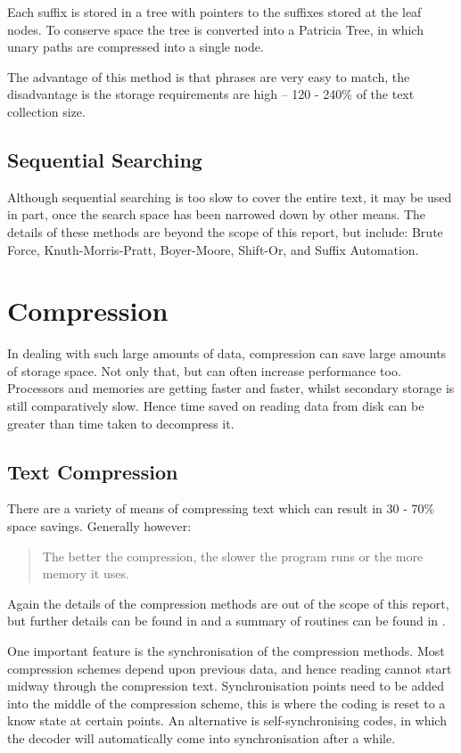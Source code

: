 Each suffix is stored in a tree with pointers to the suffixes stored at
the leaf nodes.  To conserve space the tree is converted into a Patricia
Tree, in which unary paths are compressed into a single node.

The advantage of this method is that phrases are very easy to match, the
disadvantage is the storage requirements are high -- 120 - 240\% of the 
text collection size.

\subsection{Sequential Searching}
Although sequential searching is too slow to cover the entire text, it may
be used in part, once the search space has been narrowed down by other
means.  The details of these methods are beyond the scope of this report,
but include: Brute Force, Knuth-Morris-Pratt, Boyer-Moore, Shift-Or,
and Suffix Automation.      

\section{Compression}
In dealing with such large amounts of data, compression can save large
amounts of storage space.  Not only that, but can often increase
performance too.  Processors and memories are getting faster and faster,
whilst secondary storage is still comparatively slow.  Hence time saved on
reading data from disk can be greater than time taken to decompress it.

\subsection{Text Compression}
There are a variety of means of compressing text which can result in 30 -
70\% space savings. Generally however:

\begin{quote}
The better the compression, the slower the program runs or the more memory
it uses.
\end{quote}

Again the details of the compression methods are out of the scope of this
report, but further details can be found in \cite{witten91indexing,bookstein92model,edleno98:comppatmat,gasieniec99:optlzwpat,navraf99:patzif} and a summary of routines can be found in \cite{wmb:mg}.

One important feature is the synchronisation of the compression methods.
Most compression schemes depend upon previous data, and hence reading
cannot start midway through the compression text.  Synchronisation
points need to be added into the middle of the compression scheme, this is
where the coding is reset to a know state at certain points.  An
alternative is self-synchronising codes, in which the decoder will
automatically come into synchronisation after a while.

